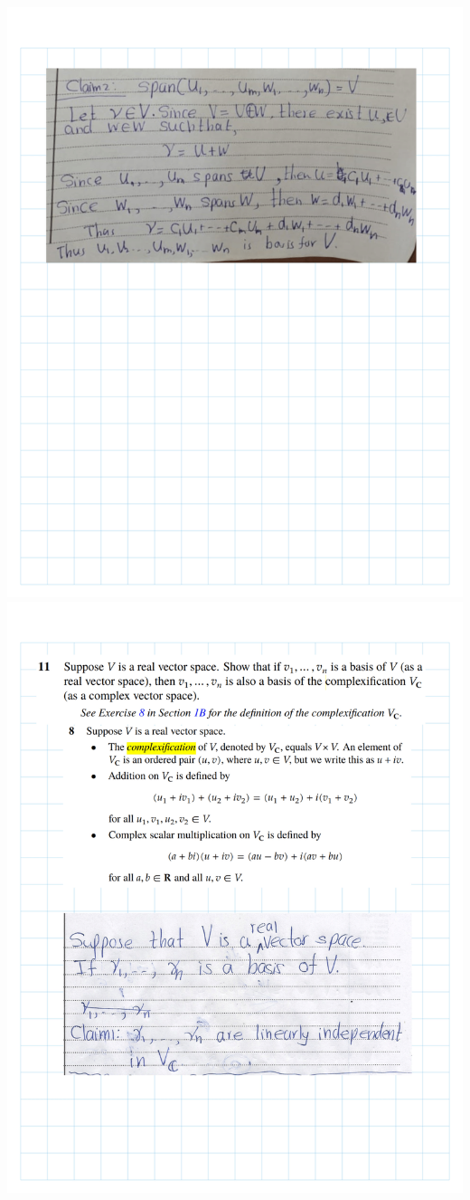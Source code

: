 \documentclass[
]{book}
\theoremstyle{definition}
\theoremstyle{definition}
\theoremstyle{definition}
\theoremstyle{definition}
\theoremstyle{remark}
\begin{document}
\includegraphics{fig/Ex 2B and 2C/EX2B (23).png}
\includegraphics{fig/Ex 2B and 2C/EX2B (24).png}
\end{document}

